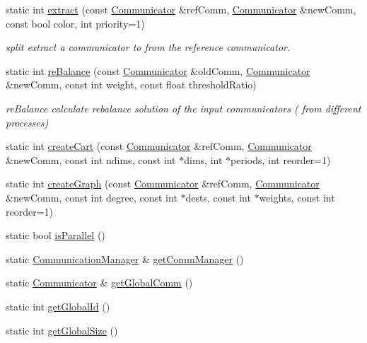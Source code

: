 \begin{DoxyCompactItemize}
static int \hyperlink{classHSF_1_1COMM_a098fb0d3618c3ff9cd18f25eed6c8c25}{extract} (const \hyperlink{classHSF_1_1Communicator}{Communicator} \&refComm, \hyperlink{classHSF_1_1Communicator}{Communicator} \&newComm, const bool color, int priority=1)
\begin{DoxyCompactList}\small\item\em split extract a communicator to from the reference communicator. \item\end{DoxyCompactList}\item 
static int \hyperlink{classHSF_1_1COMM_aaaf021a10daa5fbfa85102953a0d8f1c}{reBalance} (const \hyperlink{classHSF_1_1Communicator}{Communicator} \&oldComm, \hyperlink{classHSF_1_1Communicator}{Communicator} \&newComm, const int weight, const float thresholdRatio)
\begin{DoxyCompactList}\small\item\em reBalance calculate rebalance solution of the input communicators ( from different processes) \item\end{DoxyCompactList}\item 
static int \hyperlink{classHSF_1_1COMM_afcbab02e03ac7f6bce379be298c427de}{createCart} (const \hyperlink{classHSF_1_1Communicator}{Communicator} \&refComm, \hyperlink{classHSF_1_1Communicator}{Communicator} \&newComm, const int ndims, const int $\ast$dims, int $\ast$periods, int reorder=1)
\item 
static int \hyperlink{classHSF_1_1COMM_ae7d2271832dcd8690685d8ccbee84615}{createGraph} (const \hyperlink{classHSF_1_1Communicator}{Communicator} \&refComm, \hyperlink{classHSF_1_1Communicator}{Communicator} \&newComm, const int degree, const int $\ast$dests, const int $\ast$weights, const int reorder=1)
\item 
static bool \hyperlink{classHSF_1_1COMM_ad97b577f23c1a1f9f72d8d84b497e2c2}{isParallel} ()
\item 
static \hyperlink{classHSF_1_1CommunicationManager}{CommunicationManager} \& \hyperlink{classHSF_1_1COMM_a73b9e5bcef8100fa37a940c2dd744c7b}{getCommManager} ()
\item 
static \hyperlink{classHSF_1_1Communicator}{Communicator} \& \hyperlink{classHSF_1_1COMM_adae610b00b4c4cd966a0d19cdf5fc0e8}{getGlobalComm} ()
\item 
static int \hyperlink{classHSF_1_1COMM_a4c2a5c578e26fb2e53f8fad13f9e79ba}{getGlobalId} ()
\item 
static int \hyperlink{classHSF_1_1COMM_a454b84b21cd889f986a94fe0d51d43ee}{getGlobalSize} ()

\end{DoxyCompactItemize}
